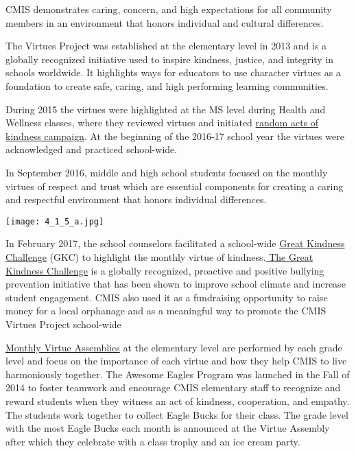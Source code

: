 \begin{findings}
CMIS demonstrates caring, concern, and high expectations for all community members in an environment that honors individual and cultural differences.

The Virtues Project was established at the elementary level in 2013 and is a globally recognized initiative used to inspire kindness, justice, and integrity in schools worldwide. It highlights ways for educators to use character virtues as a foundation to create safe, caring, and high performing learning communities. 

During 2015 the virtues were highlighted at the MS level during Health and Wellness classes, where they reviewed virtues and initiated \href{https://docs.google.com/forms/d/e/1FAIpQLScP9Fpphz10qaY0S4RO3VLKBQ54RC3WQdP-FGIBbPOcXzMwpQ/viewform?c=0&w=1}{random acts of kindness campaign}. At the beginning of the 2016-17 school year the virtues were acknowledged and practiced school-wide.


In September 2016, middle and high school students focused on the monthly virtues of respect  and trust  which are essential  components for creating a caring and respectful environment that honors individual differences.

\texttt{[image: 4\_1\_5\_a.jpg]}

In February 2017, the school counselors facilitated a school-wide \href{https://docs.google.com/a/cmis.ac.th/document/d/1PsHRple71FshloSGrqvYHgQQCYx9_CwCsbtlMAkb-Aw/edit?usp=sharing}{Great Kindness Challenge} (GKC) to highlight the monthly virtue of kindness.\href{https://dochub.com/roneldanelcapadona/gDPKV2/gkc?dt=ysuio255qfhtbryf}{ The Great Kindness Challenge} is a globally recognized, proactive and positive bullying prevention initiative that has been shown to improve school climate and increase student engagement. CMIS also used it as a fundraising opportunity to raise money for a local orphanage and as a meaningful way to promote the CMIS Virtues Project school-wide

\href{https://docs.google.com/a/cmis.ac.th/document/d/1Mv1xjTpbY36naur8SDt9GanKNfR7YtYVL-bWwGLPSHo/edit?usp=sharing}{Monthly Virtue Assemblies} at the elementary level are performed by each grade level and focus on the importance of each virtue and how they help CMIS to live harmoniously together. The Awesome Eagles Program was launched in the Fall of 2014 to foster teamwork and encourage CMIS elementary staff to recognize and reward students when they witness an act of kindness, cooperation, and empathy. The students work together to collect Eagle Bucks for their class. The grade level with the most Eagle  Bucks each month is announced at the Virtue Assembly after which they celebrate with a class trophy and an ice cream party.


\end{findings}
